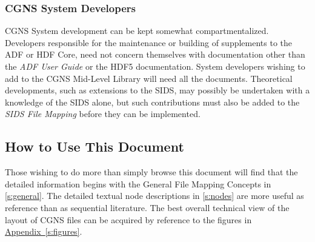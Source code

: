 \subsubsection{CGNS System Developers}

CGNS System development can be kept somewhat compartmentalized.
Developers responsible for the maintenance or building of supplements
to the ADF or HDF Core, need not concern themselves with documentation
other than the \textit{ADF User Guide} or the HDF5 documentation.
System developers wishing to add to the CGNS Mid-Level Library will need
all the documents.
Theoretical developments, such as extensions to the SIDS, may possibly
be undertaken with a knowledge of the SIDS alone, but such contributions
must also be added to the \textit{SIDS File Mapping}
before they can be implemented.

\subsection{How to Use This Document}

Those wishing to do more than simply browse this document will
find that the detailed information begins with the General File
Mapping Concepts in \autoref{s:general}. The detailed textual node
descriptions in \autoref{s:nodes} are more useful as reference than
as sequential literature. The best overall technical view of the
layout of CGNS files can be acquired by reference to the figures in
\hyperref[s:figures]{Appendix~\ref*{s:figures}}.
